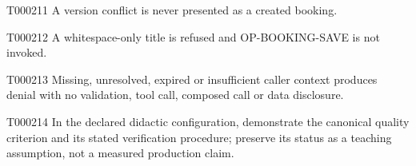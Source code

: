 \documentclass[11pt,a4paper]{article}
\begin{document}
\par{}\hypertarget{AC-BOOKING-CREATE-03}{}
\begin{atlasparagraph}{T000211}
A version conflict is never presented as a created booking.
\end{atlasparagraph}
\par{}\hypertarget{AC-BOOKING-CREATE-TITLE}{}
\begin{atlasparagraph}{T000212}
A whitespace-only title is refused and OP-BOOKING-SAVE is not invoked.
\end{atlasparagraph}
\par{}\hypertarget{AC-BOOKING-CREATE-AUTH}{}
\begin{atlasparagraph}{T000213}
Missing, unresolved, expired or insufficient caller context produces denial with no validation, tool call, composed call or data disclosure.
\end{atlasparagraph}
\par{}\hypertarget{AC-BOOKING-CREATE-QUALITY}{}
\begin{atlasparagraph}{T000214}
In the declared didactic configuration, demonstrate the canonical quality criterion and its stated verification procedure; preserve its status as a teaching assumption, not a measured production claim.
\end{atlasparagraph}
\par{}
\end{document}
